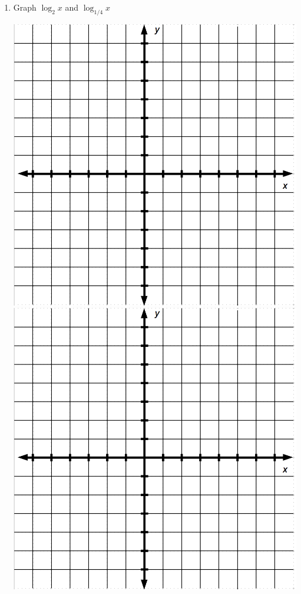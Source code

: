 \documentclass[11pt]{article}
\begin{document}
\begin{enumerate}
\item Graph $\log_2 x$ and $\log_{1/4} x$\\
\begin{center}
\includegraphics[scale=.4]{bigaxes}
\includegraphics[scale=.4]{bigaxes}\vfill
\end{center}

\end{enumerate}
\end{document}
